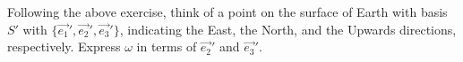 \begin{exercise}
  Following the above exercise, think of a point on the surface of Earth with
  basis $S'$ with $\{\vec{e_1}',\vec{e_2}',\vec{e_3}'\}$, indicating the East,
  the North, and the Upwards directions, respectively. Express $\omega$ in terms
  of $\vec{e_2}'$ and $\vec{e_3}'$.
\end{exercise}
